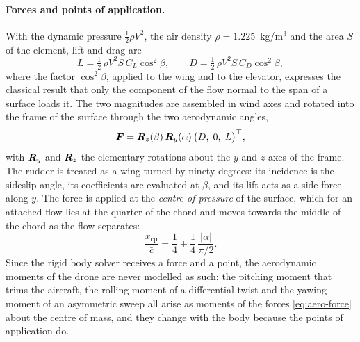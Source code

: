 \paragraph{Forces and points of application.} With the dynamic pressure $\tfrac{1}{2}\rho V^2$, the air density $\rho = 1.225$~kg/m$^3$ and the area $S$ of the element, lift and drag are
\begin{equation}
L = \tfrac{1}{2}\,\rho V^2 S\, C_L \cos^2\!\beta, \qquad D = \tfrac{1}{2}\,\rho V^2 S\, C_D \cos^2\!\beta,
\label{eq:aero-lift-drag}
\end{equation}
where the factor $\cos^2\beta$, applied to the wing and to the elevator, expresses the classical result that only the component of the flow normal to the span of a surface loads it. The two magnitudes are assembled in wind axes and rotated into the frame of the surface through the two aerodynamic angles,
\begin{equation}
\bm{F} = \bm{R}_z(\beta)\, \bm{R}_y(\alpha)\, \bigl( D,\; 0,\; L \bigr)^{\top},
\label{eq:aero-force}
\end{equation}
with $\bm{R}_y$ and $\bm{R}_z$ the elementary rotations about the $y$ and $z$ axes of the frame. The rudder is treated as a wing turned by ninety degrees: its incidence is the sideslip angle, its coefficients are evaluated at $\beta$, and its lift acts as a side force along $y$. The force is applied at the \emph{centre of pressure} of the surface, which for an attached flow lies at the quarter of the chord and moves towards the middle of the chord as the flow separates:
\begin{equation}
\frac{x_{\mathrm{cp}}}{\bar c} = \frac{1}{4} + \frac{1}{4}\, \frac{\lvert\alpha\rvert}{\pi/2} .
\label{eq:aero-cp}
\end{equation}
Since the rigid body solver receives a force and a point, the aerodynamic moments of the drone are never modelled as such: the pitching moment that trims the aircraft, the rolling moment of a differential twist and the yawing moment of an asymmetric sweep all arise as moments of the forces \eqref{eq:aero-force} about the centre of mass, and they change with the body because the points of application do.

